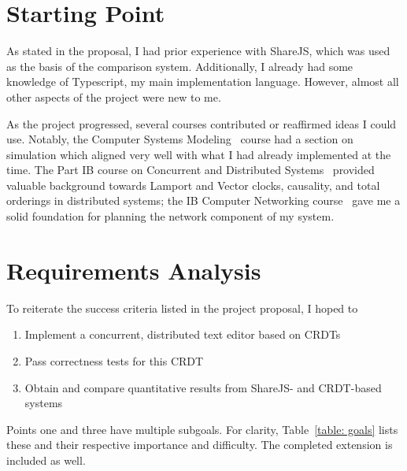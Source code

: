 \documentclass[12pt,a4paper,twoside,openright]{report}
\begin{document}
	
\section{Starting Point}

As stated in the proposal, I had prior experience with ShareJS, which was used as the basis of the comparison system. Additionally, I already had some knowledge of Typescript, my main implementation language. However, almost all other aspects of the project were new to me.

As the project progressed, several courses contributed or reaffirmed ideas I could use. Notably, the Computer Systems Modeling~\cite{compsysmodeling} course had a section on simulation which aligned very well with what I had already implemented at the time. The Part IB course on Concurrent and Distributed Systems~\cite{concdistsystems} provided valuable background towards Lamport and Vector clocks, causality, and total orderings in distributed systems; the IB Computer Networking course~\cite{computernetworking} gave me a solid foundation for planning the network component of my system.



\section{Requirements Analysis}
To reiterate the success criteria listed in the project proposal, I hoped to

\begin{enumerate}
\item Implement a concurrent, distributed text editor based on CRDTs 
\item Pass correctness tests for this CRDT
\item Obtain and compare quantitative results from ShareJS- and CRDT-based systems
\end{enumerate}

Points one and three have multiple subgoals. For clarity, Table~\ref{table: goals} lists these and their respective importance and difficulty. The completed extension is included as well.
\end{document}
